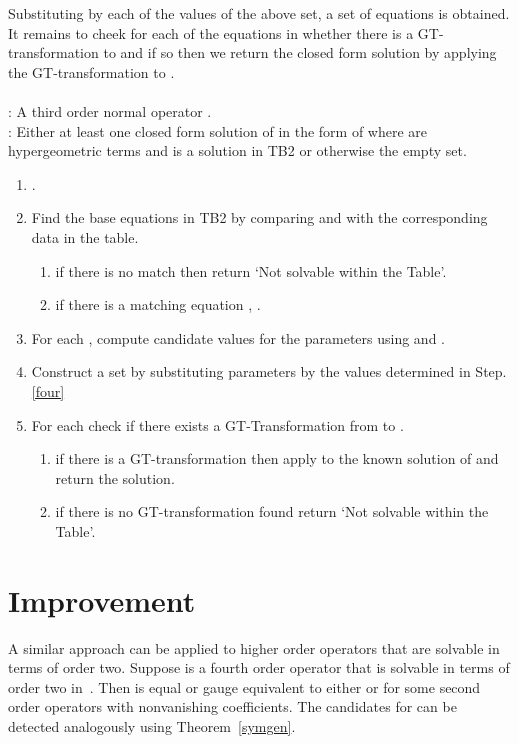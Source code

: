 \documentclass{article}
\begin{document}
Substituting  by each of the values of the above set, a set of equations  is obtained. 
It remains to cheek for each of the equations in  whether there is a GT-transformation to  and 
if so then we return the closed form solution by applying the GT-transformation to 
. 
\\

\\
: A third order normal operator .\\
: Either at least one closed form solution of  in the form of  where 
 are hypergeometric terms and  is a solution in TB2 or otherwise the empty set.

\begin{enumerate}
\item  .
\item Find the base equations in TB2 by comparing  and  with the corresponding data in the table.
\begin{enumerate}
\item if there is no match then return `Not solvable within the Table'.
\item if there is a matching equation , .
\end{enumerate}
\item\label{four} For each , compute candidate values for the parameters using  and .
\item Construct a set  by substituting parameters by the values determined in Step.\ref{four}
\item For each  check if there exists a GT-Transformation from  to .
\begin{enumerate}
\item if there is a GT-transformation then apply  to the known solution of  and return the solution.
\item if there is no GT-transformation found return `Not solvable within the Table'. 
\end{enumerate}

\end{enumerate}






\section{Improvement}
A similar approach can be applied to higher order operators that are solvable in terms
of order two. Suppose  is a fourth order operator that is solvable in terms of order 
two in~. Then  is equal or gauge equivalent to either  or 
for some second order operators  with nonvanishing coefficients. The candidates
for  can be detected analogously using Theorem~\ref{symgen}.
\end{document}
